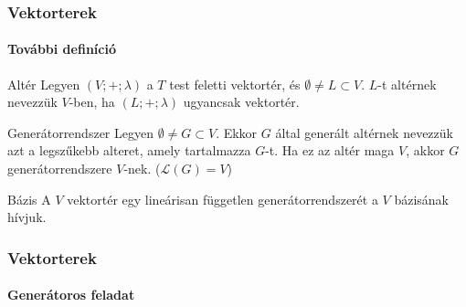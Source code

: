 \begin{frame}
  \frametitle{Vektorterek}
  \framesubtitle{További definíció}

  \begin{block}{Altér}
    Legyen $(V; +; \lambda)$ a $T$ test feletti vektortér, és
    $\emptyset \neq L \subset V$. $L$-t altérnek nevezzük $V$-ben, ha
    $(L; +; \lambda)$ ugyancsak vektortér.
  \end{block}

  \begin{block}{Generátorrendszer}
    Legyen $\emptyset \neq G \subset V$. Ekkor $G$ által generált altérnek
    nevezzük azt a legszűkebb alteret, amely tartalmazza $G$-t. Ha ez az
    altér maga $V$, akkor $G$ generátorrendszere $V$-nek. ($\mathcal L(G)=V$)
  \end{block}

  \begin{block}{Bázis}
    A $V$ vektortér egy lineárisan független generátorrendszerét a $V$ bázisának
    hívjuk.
  \end{block}
\end{frame}

\begin{frame}
  \frametitle{Vektorterek}
  \framesubtitle{Generátoros feladat}

  
\end{frame}
